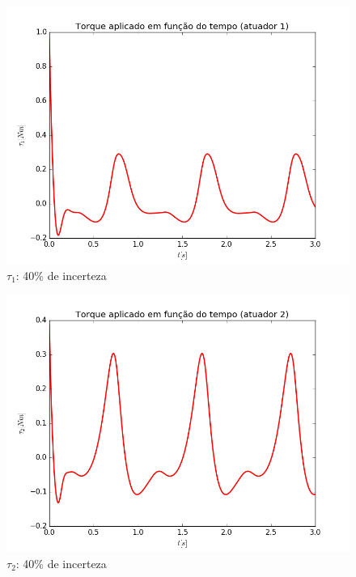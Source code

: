 \documentclass[]{politex}
\begin{document}
\begin{multicols}{2}
\begin{figure}[H]
	\centering
	\includegraphics[scale=0.42]{imagens/tau1_40.png}  
	\caption{$\tau_1$: 40\% de incerteza}
	\label{fig:Torque1_40}
\end{figure}
\begin{figure}[H]
	\centering
	\includegraphics[scale=0.42]{imagens/tau2_40.png}  
	\caption{$\tau_2$: 40\% de incerteza}
	\label{fig:Torque2_40}
\end{figure}
\end{multicols}  

\newpage
\end{document}

